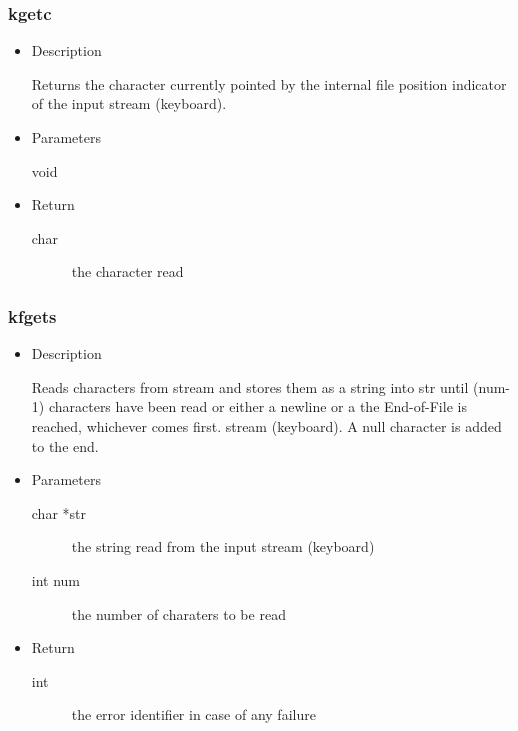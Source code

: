 \subsubsection{kgetc}
\begin{itemize}
  \item{Description}

	 Returns the character currently pointed by the internal file position indicator of the input stream (keyboard).
  \item{Parameters}
	 \begin{description}
		\item[void] 
	 \end{description}
  \item{Return}
	 \begin{description}
		\item[char] the character read
	 \end{description}
\end{itemize}

\subsubsection{kfgets}
\begin{itemize}
  \item{Description}

	 Reads characters from stream and stores them as a string into str until (num-1)
	 characters have been read or either a newline or a the End-of-File is reached,
	 whichever comes first. stream (keyboard). A null character is added to the end.
  \item{Parameters}
	 \begin{description}
		\item[char *str]  the string read from the input stream (keyboard)
		\item[int num]  the number of charaters to be read
	 \end{description}
  \item{Return}
	 \begin{description}
		\item[int] the error identifier in case of any failure
	 \end{description}
\end{itemize}



